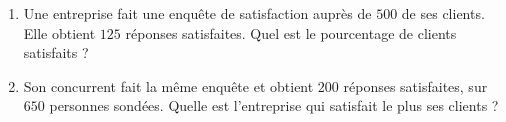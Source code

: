 

\begin{rituel}
\begin{enumerate}
    \item
        Une entreprise fait une enquête de satisfaction auprès de \( 500\) de ses clients. Elle obtient \( 125\) réponses satisfaites. Quel est le pourcentage de clients satisfaits ?
    \item
        Son concurrent fait la même enquête et obtient \( 200\) réponses satisfaites, sur \( 650\) personnes sondées. Quelle est l'entreprise qui satisfait le plus ses clients ?
\end{enumerate}

\end{rituel}
